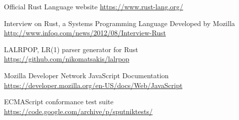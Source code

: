 \documentclass{article}
\begin{document}
\pagebreak

\begin{thebibliography}{9}
  Official Rust Language website
  \href{https://www.rust-lang.org/}{https://www.rust-lang.org/}

  Interview on Rust, a Systems Programming Language Developed by Mozilla
  \href{http://www.infoq.com/news/2012/08/Interview-Rust}{http://www.infoq.com/news/2012/08/Interview-Rust}

  LALRPOP, LR(1) parser generator for Rust
  \href{https://github.com/nikomatsakis/lalrpop}{https://github.com/nikomatsakis/lalrpop}

  Mozilla Developer Network JavaScript Documentation
  \href{https://developer.mozilla.org/en-US/docs/Web/JavaScript}{https://developer.mozilla.org/en-US/docs/Web/JavaScript}

  ECMAScript conformance test suite
  \href{https://code.google.com/archive/p/sputniktests/}{https://code.google.com/archive/p/sputniktests/}
\end{thebibliography}
\end{document}
